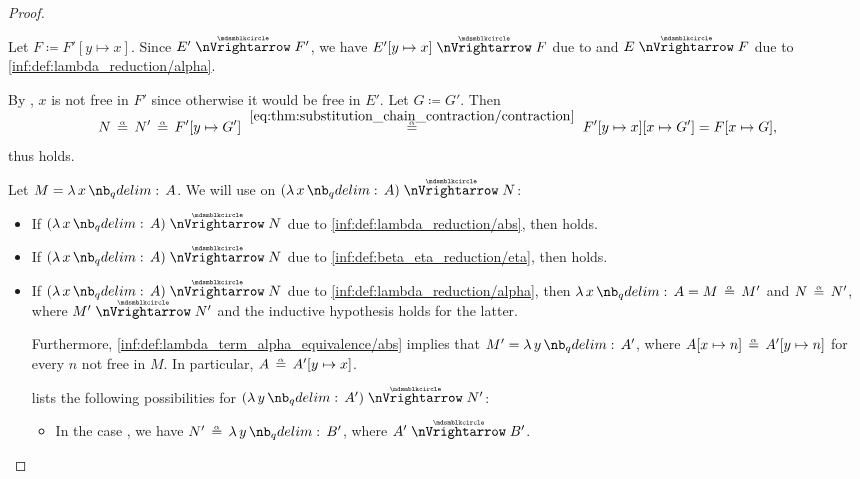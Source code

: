 \begin{proof}
\begin{itemize}
\begin{itemize}
\begin{itemize}
        Let \( F \coloneqq F'[y \mapsto x] \). Since \( E' \ppred F' \), we have \( E'[y \mapsto x] \ppred F \) due to  and \( E \ppred F \) due to \ref{inf:def:lambda_reduction/alpha}.

        By , \( x \) is not free in \( F' \) since otherwise it would be free in \( E' \). Let \( G \coloneqq G' \). Then
        \begin{equation*}
          N
          \aequiv
          N'
          \aequiv
          F'[y \mapsto G']
          \reloset {\eqref{eq:thm:substitution_chain_contraction/contraction}} \aequiv
          F'[y \mapsto x][x \mapsto G']
          =
          F[x \mapsto G],
        \end{equation*}
        thus  holds.
      \end{itemize}
    \end{itemize}
  \end{itemize}

   Let \( M = \qabs x A \). We will use  on \( (\qabs x A) \ppred N \):
  \begin{itemize}
    \item If \( (\qabs x A) \ppred N \) due to \ref{inf:def:lambda_reduction/abs}, then  holds.

    \item If \( (\qabs x A) \ppred N \) due to \ref{inf:def:beta_eta_reduction/eta}, then  holds.

    \item If \( (\qabs x A) \ppred N \) due to \ref{inf:def:lambda_reduction/alpha}, then \( \qabs x A = M \aequiv M' \) and \( N \aequiv N' \), where \( M' \ppred N' \) and the inductive hypothesis holds for the latter.

    Furthermore, \ref{inf:def:lambda_term_alpha_equivalence/abs} implies that \( M' = \qabs y A' \), where \( A[x \mapsto n] \aequiv A'[y \mapsto n] \) for every \( n \) not free in \( M \). In particular, \( A \aequiv A'[y \mapsto x] \).

     lists the following possibilities for \( (\qabs y A') \ppred N' \):
    \begin{itemize}
      \item In the case , we have \( N' \aequiv \qabs y B' \), where \( A' \ppred B' \).


\end{itemize}
\end{itemize}
\end{proof}
